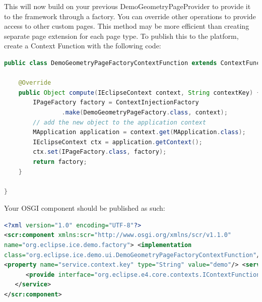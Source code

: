 \documentclass{article}
\begin{document}
This will now build on your previous DemoGeometryPageProvider to provide it to
the framework through a factory. You can override other operations to provide
access to other custom pages. This method may be more efficient than creating
separate page extension for each page type. To publish this to the platform,
create a Context Function with the following code:

\begin{lstlisting}[language=java]
public class DemoGeometryPageFactoryContextFunction extends ContextFunction {

    @Override
    public Object compute(IEclipseContext context, String contextKey) {
        IPageFactory factory = ContextInjectionFactory
                .make(DemoGeometryPageFactory.class, context);
        // add the new object to the application context
        MApplication application = context.get(MApplication.class);
        IEclipseContext ctx = application.getContext();
        ctx.set(IPageFactory.class, factory);
        return factory;
    }

}
\end{lstlisting}

Your OSGI component should be published as such:

\begin{lstlisting}[language=xml]
<?xml version="1.0" encoding="UTF-8"?>
<scr:component xmlns:scr="http://www.osgi.org/xmlns/scr/v1.1.0"
name="org.eclipse.ice.demo.factory"> <implementation
class="org.eclipse.ice.demo.ui.DemoGeometryPageFactoryContextFunction"/>
<property name="service.context.key" type="String" value="demo"/> <service>
      <provide interface="org.eclipse.e4.core.contexts.IContextFunction"/>
   </service>
</scr:component>
\end{lstlisting}
\end{document}
